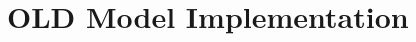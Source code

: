 \chapter[OLD Model Implementation]{OLD Model Implementation}
\label{appendix-model-implementation}








 



